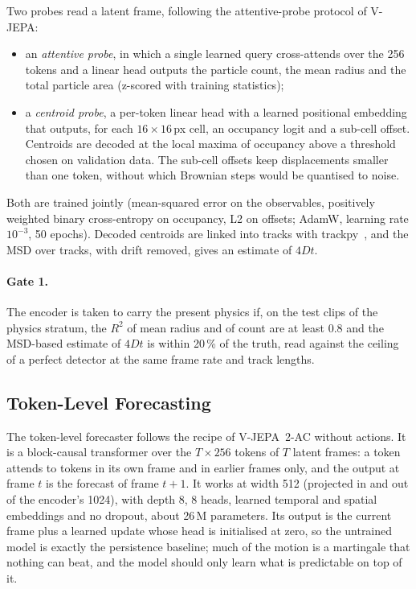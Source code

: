 Two probes read a latent frame, following the attentive-probe protocol of V-JEPA:
\begin{itemize}
  \item an \emph{attentive probe}, in which a single learned query cross-attends over the
    256 tokens and a linear head outputs the particle count, the mean radius and the
    total particle area (z-scored with training statistics);
  \item a \emph{centroid probe}, a per-token linear head with a learned positional
    embedding that outputs, for each $16 \times 16$\,px cell, an occupancy logit and a
    sub-cell offset. Centroids are decoded at the local maxima of occupancy above a
    threshold chosen on validation data. The sub-cell offsets keep displacements
    smaller than one token, without which Brownian steps would be quantised to noise.
\end{itemize}
Both are trained jointly (mean-squared error on the observables, positively weighted
binary cross-entropy on occupancy, L2 on offsets; AdamW, learning rate $10^{-3}$, 50
epochs). Decoded centroids are linked into tracks with trackpy~\cite{trackpy}, and the
MSD over tracks, with drift removed, gives an estimate of $4Dt$.

\paragraph{Gate 1.} The encoder is taken to carry the present physics if, on the test
clips of the physics stratum, the $R^2$ of mean radius and of count are at least 0.8 and
the MSD-based estimate of $4Dt$ is within 20\,\% of the truth, read against the
ceiling of a perfect detector at the same frame rate and track lengths.

\subsection{Token-Level Forecasting}
\label{sec:token-forecast}

The token-level forecaster follows the recipe of V-JEPA~2-AC without actions. It is a
block-causal transformer over the $T \times 256$ tokens of $T$ latent frames: a token
attends to tokens in its own frame and in earlier frames only, and the output at frame
$t$ is the forecast of frame $t+1$. It works at width 512 (projected in and out of the
encoder's 1024), with depth 8, 8 heads, learned temporal and spatial embeddings and no
dropout, about 26\,M parameters. Its output is the current frame plus a learned update
whose head is initialised at zero, so the untrained model is exactly the persistence
baseline; much of the motion is a martingale that nothing can beat, and the model
should only learn what is predictable on top of it.

